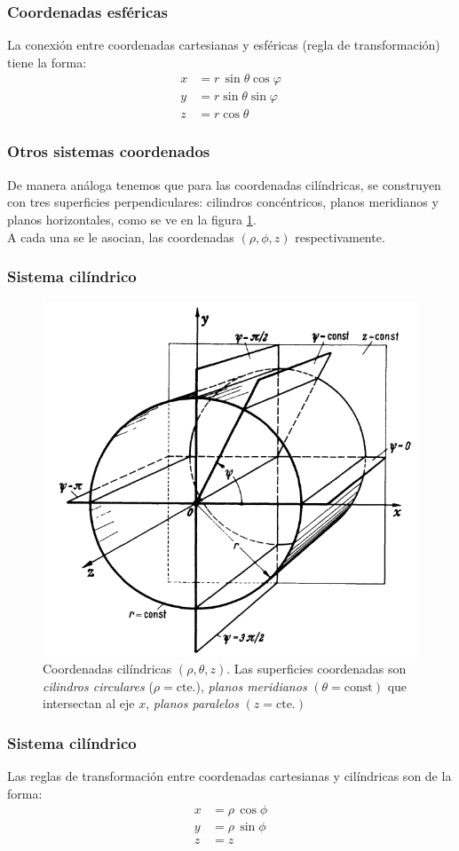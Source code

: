 \documentclass[12pt]{beamer}
\begin{document}
\begin{frame}
\frametitle{Coordenadas esféricas}
La conexión entre coordenadas cartesianas y esféricas (regla de transformación) tiene la forma:
\begin{align*}
x &= r \, \sin \theta \cos \varphi \\
y &= r \sin \theta \sin \varphi \\
z &= r \cos \theta
\end{align*}
\end{frame}
\begin{frame}
\frametitle{Otros sistemas coordenados}
De manera análoga tenemos que para las coordenadas cilíndricas, se construyen con tres superficies perpendiculares: cilindros concéntricos, planos meridianos y planos horizontales, como se ve en la figura \ref{fig:figura_planos_cilindricos}.
\\
\bigskip
\pause
A cada una se le asocian, las coordenadas $(\rho, \phi, z)$ respectivamente.
\end{frame}
\begin{frame}
\frametitle{Sistema cilíndrico}
\begin{figure}[h!]
   \centering
   \includegraphics{Imagenes/Planos_Coordenadas_Cilindricas.png}
   \caption{Coordenadas cilíndricas $(\rho, \theta, z)$. Las superficies coordenadas son \emph{cilindros circulares} ($\rho = \mbox{cte.}$), \emph{planos meridianos} $(\theta = \mbox{const})$ que intersectan al eje $x$, \emph{planos paralelos} $(z = \mbox{cte.})$}
   \label{fig:figura_planos_cilindricos}
\end{figure}
\end{frame}
\begin{frame}
\frametitle{Sistema cilíndrico}
Las reglas de transformación entre coordenadas cartesianas y cilíndricas son de la forma:
\begin{align*}
x &= \rho \, \cos \phi \\ 
y &= \rho \, \sin \phi \\
z &= z
\end{align*}
\end{frame}
\end{document}
